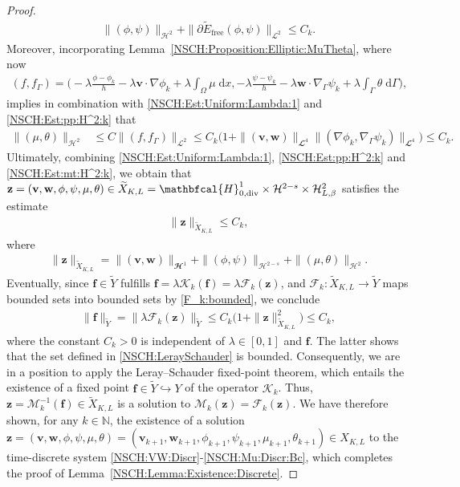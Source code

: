 \documentclass[11pt,reqno]{amsart}
\theoremstyle{remark}
\numberwithin{equation}{section}
\newcommand{\norm}[1]{\| #1 \|}
\newcommand{\N}{\mathbb N}
\newcommand{\intO}{\int_\Omega}
\newcommand{\intG}{\int_\Gamma}
\newcommand{\dx}{\;\mathrm{d}x}
\newcommand{\dG}{\;\mathrm d\Ga}
\newcommand{\Grad}{\nabla}
\newcommand{\Div}{\textnormal{div}}
\newcommand{\Gradg}{\nabla_\Ga}
\newcommand{\emb}{\hookrightarrow}
\newcommand{\Ga}{\Gamma}
\newcommand{\f}{\mathbf f}
\newcommand{\bv}{\mathbf v}
\newcommand{\bw}{\mathbf w}
\newcommand{\free}{\mathrm{free}}
\begin{document}
\begin{proof}
\begin{align}\label{NSCH:Est:pp:H^2:k}
    \norm{(\phi,\psi)}_{\mathcal{H}^2} + \norm{\partial\widetilde E_\free(\phi,\psi)}_{\mathcal{L}^2} \leq C_k.
\end{align}
Moreover, incorporating Lemma~\ref{NSCH:Proposition:Elliptic:MuTheta}, where now
\begin{align*}
	(f,f_\Ga) = \Big(-\lambda\frac{\phi-\phi_k}{h} - \lambda\bv\cdot\Grad\phi_k + \lambda\intO\mu\dx, -\lambda\frac{\psi-\psi_k}{h} - \lambda\bw\cdot\Gradg\psi_k + \lambda\intG\theta\dG\Big),
\end{align*} 
implies in combination with \eqref{NSCH:Est:Uniform:Lambda:1} and \eqref{NSCH:Est:pp:H^2:k} that
\begin{align}\label{NSCH:Est:mt:H^2:k}
    \norm{(\mu,\theta)}_{\mathcal{H}^2} &\leq C\norm{(f,f_\Ga)}_{\mathcal{L}^2} 
    \leq C_k\Big(1 + \norm{(\bv,\bw)}_{\mathbfcal{L}^4}\norm{(\Grad\phi_k,\Gradg\psi_k)}_{\mathbfcal{L}^4}\Big) 
    \leq C_k. 
\end{align}
Ultimately, combining \eqref{NSCH:Est:Uniform:Lambda:1}, \eqref{NSCH:Est:pp:H^2:k} and \eqref{NSCH:Est:mt:H^2:k}, we obtain that $\mathbf{z} = (\bv,\bw,\phi,\psi,\mu,\theta)\in\widetilde X_{K,L} = \mathbfcal{H}^1_{0,\Div}\times\mathcal{H}^{2-s}\times\mathcal{H}^2_{L,\beta}$ satisfies the estimate
\begin{align*}
    \norm{\mathbf{z}}_{\widetilde X_{K,L}} \leq C_k,
\end{align*}
where
\begin{align*}
    \norm{\mathbf{z}}_{\widetilde X_{K,L}} = \norm{(\bv,\bw)}_{\mathbfcal{H}^1} + \norm{(\phi,\psi)}_{\mathcal{H}^{2-s}} + \norm{(\mu,\theta)}_{\mathcal{H}^2}.
\end{align*}
Eventually, since $\mathbf{f}\in\widetilde{Y}$ fulfills $\mathbf{f} = \lambda\mathcal{K}_k(\mathbf{f}) = \lambda\mathcal{F}_k(\mathbf{z})$, and $\mathcal{F}_k:\widetilde X_{K,L}\rightarrow\widetilde{Y}$ maps bounded sets into bounded sets by \eqref{F_k:bounded}, we conclude
\begin{align*}
    \norm{\mathbf{f}}_{\widetilde{Y}} = \norm{\lambda\mathcal{F}_k(\mathbf{z})}_{\widetilde{Y}} \leq C_k\big(1 + \norm{\mathbf{z}}_{\widetilde{X}_{K,L}}^2\big) \leq C_k,
\end{align*}
where the constant $C_k > 0$ is independent of $\lambda\in[0,1]$ and $\mathbf{f}$. The latter shows that the set defined in \eqref{NSCH:LeraySchauder} is bounded. Consequently, we are in a position to apply the Leray--Schauder fixed-point theorem, which entails the existence of a fixed point $\f\in\widetilde Y\emb Y$ of the operator $\mathcal{K}_k$. Thus, $\mathbf{z} = \mathcal{M}_k^{-1}(\mathbf{f})\in\widetilde X_{K,L}$ is a solution to $\mathcal{M}_k(\mathbf{z}) = \mathcal{F}_k(\mathbf{z})$. We have therefore shown, for any $k\in\N$, the existence of a solution $\mathbf{z} = (\bv,\bw,\phi,\psi,\mu,\theta) = (\bv_{k+1},\bw_{k+1},\phi_{k+1},\psi_{k+1},\mu_{k+1},\theta_{k+1})\in X_{K,L}$ to the time-discrete system \eqref{NSCH:VW:Discr}-\eqref{NSCH:Mu:Discr:Bc}, which completes the proof of Lemma~\ref{NSCH:Lemma:Existence:Discrete}.
\end{proof}
\end{document}
